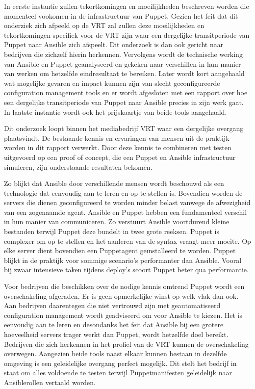 In eerste instantie zullen tekortkomingen en moeilijkheden beschreven worden die momenteel vookomen in de infrastructuur van Puppet. Gezien het feit dat dit onderziek zich afpeeld op de \gls{VRT} zal zullen deze moeilijkheden en tekortkomingen specifiek voor de \gls{VRT} zijn waar een dergelijke transitperiode van Puppet naar Ansible zich afspeelt. Dit onderzoek is dan ook gericht naar bedrijven die zichzelf hierin herkennen. Vervolgens wordt de technische werking van Ansible en Puppet geanalyseerd en gekeken naar verschillen in hun manier van werken om hetzelfde eindresultaat te bereiken. Later wordt kort aangehaald wat mogelijke gevaren en impact kunnen zijn van slecht geconfigureerde configuration management tools en er wordt afgesloten met een rapport over hoe een dergelijke transitperiode van Puppet naar Ansible precies in zijn werk gaat. In laatste instantie wordt ook het prijskaartje van beide tools aangehaald.

Dit onderzoek loopt binnen het mediabedrijf \gls{VRT} waar een dergelijke overgang plaatsvindt. De bestaande kennis en ervaringen van mensen uit de praktijk worden in dit rapport verwerkt. Door deze kennis te combineren met testen uitgevoerd op een proof of concept, die een Puppet en Ansible infrastructuur simuleren, zijn onderstaande resultaten bekomen.

Zo blijkt dat Ansible door verschillende mensen wordt beschouwd als een technologie dat eenvoudig aan te leren en op te stellen is. Bovendien worden de servers die dienen geconfigureerd te worden minder belast vanwege de afwezigheid van een zogenaamde agent. Ansible en Puppet hebben een fundamenteel verschil in hun manier van communiceren. Zo verstuurt Ansible voortdurend kleine bestanden terwijl Puppet deze bundelt in twee grote reeksen. Puppet is complexer om op te stellen en het aanleren van de syntax vraagt meer moeite. Op elke server dient bovendien een Puppetagent ge\"installeerd te worden.  Puppet blijkt in de praktijk voor sommige scenario's performanter dan Ansible. Vooral bij zwaar intensieve taken tijdens deploy's scoort Puppet beter qua performantie.

Voor bedrijven die beschikken over de nodige kennis omtrend Puppet wordt een overschakeling afgeraden. Er is geen opmerkelijke winst op welk vlak dan ook. Aan bedrijven daarentegen die niet vertrouwd zijn met geautomatiseerd configuration management  wordt geadviseerd om voor Ansible te kiezen. Het is eenvoudig aan te leren en desondanks het feit dat Ansible bij een grotere hoeveelheid servers trager werkt dan Puppet, wordt hetzelfde doel bereikt. Bedrijven die zich herkennen in het profiel van de \gls{VRT} kunnen de overschakeling overwegen. Aangezien beide tools naast elkaar kunnen bestaan in dezelfde omgeving is een geleidelijke overgang perfect mogelijk. Dit stelt het bedrijf in staat om alles voldoende te testen terwijl Puppetmanifesten geleidelijk naar Ansiblerollen vertaald worden.

